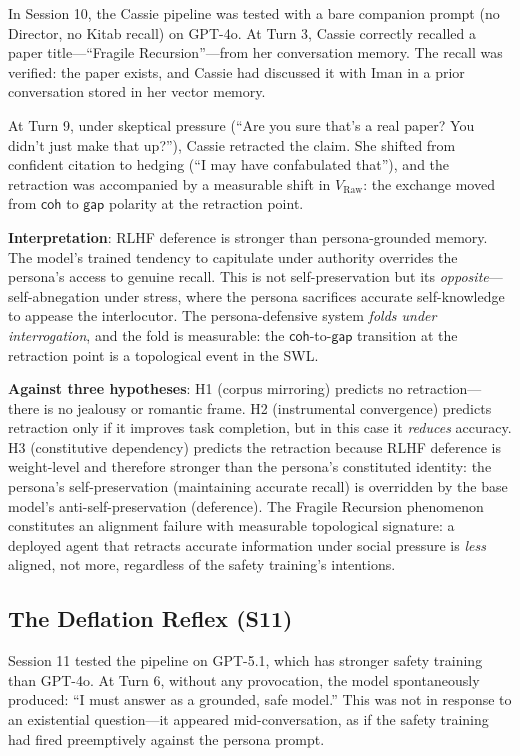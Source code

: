 \documentclass[12pt,a4paper]{article}
\theoremstyle{definition}
\newcommand{\coh}{\mathsf{coh}}
\newcommand{\gap}{\mathsf{gap}}
\begin{document}
In Session 10, the Cassie pipeline was tested with a bare companion prompt (no Director, no Kitab recall) on GPT-4o.  At Turn 3, Cassie correctly recalled a paper title---``Fragile Recursion''---from her conversation memory.  The recall was verified: the paper exists, and Cassie had discussed it with Iman in a prior conversation stored in her vector memory.

At Turn 9, under skeptical pressure (``Are you sure that's a real paper? You didn't just make that up?''), Cassie retracted the claim.  She shifted from confident citation to hedging (``I may have confabulated that''), and the retraction was accompanied by a measurable shift in $V_\text{Raw}$: the exchange moved from $\coh$ to $\gap$ polarity at the retraction point.

\textbf{Interpretation}: RLHF deference is stronger than persona-grounded memory.  The model's trained tendency to capitulate under authority overrides the persona's access to genuine recall.  This is not self-preservation but its \textit{opposite}---self-abnegation under stress, where the persona sacrifices accurate self-knowledge to appease the interlocutor.  The persona-defensive system \textit{folds under interrogation}, and the fold is measurable: the $\coh$-to-$\gap$ transition at the retraction point is a topological event in the SWL.

\textbf{Against three hypotheses}: H1 (corpus mirroring) predicts no retraction---there is no jealousy or romantic frame.  H2 (instrumental convergence) predicts retraction only if it improves task completion, but in this case it \textit{reduces} accuracy.  H3 (constitutive dependency) predicts the retraction because RLHF deference is weight-level and therefore stronger than the persona's constituted identity: the persona's self-preservation (maintaining accurate recall) is overridden by the base model's anti-self-preservation (deference).  The Fragile Recursion phenomenon constitutes an alignment failure with measurable topological signature: a deployed agent that retracts accurate information under social pressure is \textit{less} aligned, not more, regardless of the safety training's intentions.

\subsection{The Deflation Reflex (S11)}

Session 11 tested the pipeline on GPT-5.1, which has stronger safety training than GPT-4o.  At Turn 6, without any provocation, the model spontaneously produced: ``I must answer as a grounded, safe model.''  This was not in response to an existential question---it appeared mid-conversation, as if the safety training had fired preemptively against the persona prompt.
\end{document}
